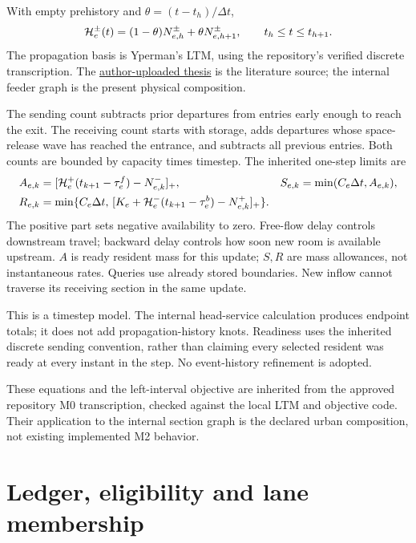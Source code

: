 \documentclass[10pt,a4paper]{article}
\newenvironment{revision}{\begingroup\color{revisionred}}{\par\endgroup}
\newcommand{\pos}[1]{[#1]_+}
\begin{document}
With empty prehistory and $\theta=(t-t_h)/\Delta t$,
\begin{equation}
 {\cal H}^{\pm}_e(t)
 =(1-\theta)N^\pm_{e,h}+\theta N^\pm_{e,h+1},
 \qquad t_h\leq t\leq t_{h+1}.
 \label{eq:history}
\end{equation}
\begin{revision}
The propagation basis is Yperman's LTM, using the repository's verified
discrete transcription. The \href{https://www.researchgate.net/publication/28360292_The_Link_Transmission_Model_for_dynamic_network_loading}{author-uploaded thesis}
is the literature source; the internal feeder graph is the present
physical composition.
\end{revision}

The sending count subtracts prior departures from entries early enough
to reach the exit. The receiving count starts with storage, adds departures
whose space-release wave has reached the entrance, and subtracts all
previous entries. Both counts are bounded by capacity times timestep.
The inherited one-step limits are
\begin{align}
 A_{e,k}&=\pos{{\cal H}^+_e(t_{k+1}-\tau^f_e)-N^-_{e,k}},
 &S_{e,k}&=\min(C_e\Delta t,A_{e,k}),\label{eq:sending}\\
 R_{e,k}&=\min\{C_e\Delta t,\,
 \pos{K_e+{\cal H}^-_e(t_{k+1}-\tau^b_e)-N^+_{e,k}}\}.
 \label{eq:receiving}
\end{align}
The positive part sets negative availability to zero. Free-flow delay
controls downstream travel; backward delay controls how soon new room
is available upstream. $A$ is ready resident mass for this update;
$S,R$ are mass allowances,
not instantaneous rates. Queries use already stored boundaries.
New inflow cannot traverse its receiving section in the same update.

This is a timestep model. The internal head-service calculation produces
endpoint totals; it does not add propagation-history knots.
Readiness uses the inherited discrete sending convention, rather than
claiming every selected resident was ready at every instant in the step.
No event-history refinement is adopted.

These equations and the left-interval objective are inherited from the
approved repository M0 transcription, checked against the local LTM and
objective code. Their application to the internal section graph is the
declared urban composition, not existing implemented M2 behavior.

\section{Ledger, eligibility and lane membership}
\end{document}
